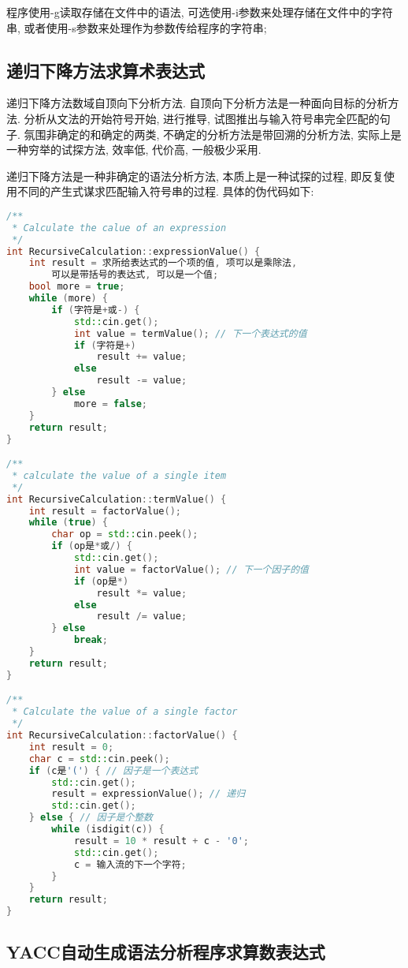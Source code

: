 程序使用-g读取存储在文件中的语法, 可选使用-i参数来处理存储在文件中的字符串,
或者使用-s参数来处理作为参数传给程序的字符串;

\subsection{递归下降方法求算术表达式}
递归下降方法数域自顶向下分析方法. 自顶向下分析方法是一种面向目标的分析方法.
分析从文法的开始符号开始, 进行推导, 试图推出与输入符号串完全匹配的句子.
氛围非确定的和确定的两类, 不确定的分析方法是带回溯的分析方法,
实际上是一种穷举的试探方法, 效率低, 代价高, 一般极少采用.\par

递归下降方法是一种非确定的语法分析方法, 本质上是一种试探的过程,
即反复使用不同的产生式谋求匹配输入符号串的过程. 具体的伪代码如下:
\begin{lstlisting}[language=c++]
/**
 * Calculate the calue of an expression
 */
int RecursiveCalculation::expressionValue() {
    int result = 求所给表达式的一个项的值, 项可以是乘除法,
        可以是带括号的表达式, 可以是一个值;
    bool more = true;
    while (more) {
        if (字符是+或-) {
            std::cin.get();
            int value = termValue(); // 下一个表达式的值
            if (字符是+)
                result += value;
            else
                result -= value;
        } else
            more = false;
    }
    return result;
}

/**
 * calculate the value of a single item
 */
int RecursiveCalculation::termValue() {
    int result = factorValue();
    while (true) {
        char op = std::cin.peek();
        if (op是*或/) {
            std::cin.get();
            int value = factorValue(); // 下一个因子的值
            if (op是*)
                result *= value;
            else
                result /= value;
        } else
            break;
    }
    return result;
}

/**
 * Calculate the value of a single factor
 */
int RecursiveCalculation::factorValue() {
    int result = 0;
    char c = std::cin.peek();
    if (c是'(') { // 因子是一个表达式
        std::cin.get();
        result = expressionValue(); // 递归
        std::cin.get();
    } else { // 因子是个整数
        while (isdigit(c)) {
            result = 10 * result + c - '0';
            std::cin.get();
            c = 输入流的下一个字符;
        }
    }
    return result;
}
\end{lstlisting}

\subsection{YACC自动生成语法分析程序求算数表达式}

